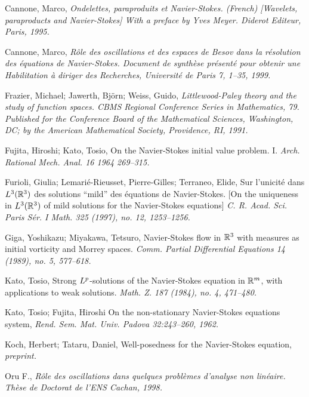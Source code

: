 \documentclass[12pt]{amsart}
\newcommand{\R}{{\mathbb R}}
\begin{document}
\begin{thebibliography}{999}

Cannone, Marco, {\em Ondelettes, paraproduits et Navier-Stokes. (French) 
[Wavelets, paraproducts and Navier-Stokes] With a preface by Yves
Meyer. Diderot Editeur, Paris, 1995.}

Cannone, Marco, {\em R\^ole des oscillations et des espaces de Besov 
dans la r\'esolution des \'equations de Navier-Stokes. 
Document de synth\`ese pr\'esent\'e pour obtenir une Habilitation \`a 
diriger des Recherches, Universit\'e de Paris 7, 1--35, 1999.}

Frazier, Michael; Jawerth, Bj\"orn; Weiss, Guido, 
{\em Littlewood-Paley theory and the study of function spaces. 
CBMS Regional Conference
Series in Mathematics, 79. 
Published for the Conference Board of the Mathematical Sciences, 
Washington, DC; by the American Mathematical Society,
Providence, RI, 1991.}

Fujita, Hiroshi; Kato, Tosio, 
On the Navier-Stokes initial value problem. I. 
{\em Arch. Rational Mech. Anal. 16 1964 269--315.}

Furioli, Giulia; Lemari\'e-Rieusset, Pierre-Gilles; Terraneo, Elide, 
Sur l'unicit\'e dans $L\sp 3({\R}\sp 3)$ des solutions ``mild'' des 
\'equations de Navier-Stokes.
[On the uniqueness in
$L\sp 3({\R}\sp 3)$ of mild solutions for the Navier-Stokes equations] 
{\em C. R. Acad. Sci. Paris S\'er. I Math. 325 (1997), no. 12, 1253--1256.}

Giga, Yoshikazu; Miyakawa, Tetsuro, Navier-Stokes flow in 
$\R\sp 3$ with measures as initial vorticity and Morrey spaces. 
{\em Comm.
Partial Differential Equations 14 (1989), no. 5, 577--618.}

Kato, Tosio, Strong $L\sp{p}$-solutions of the Navier-Stokes equation in 
${\R}\sp{m}$, with applications to weak solutions. 
{\em Math.
Z. 187 (1984), no. 4, 471--480.}

Kato, Tosio; Fujita, Hiroshi  
On the non-stationary 
Navier-Stokes equations system, 
{\em Rend. Sem. Mat. Univ. 
Padova 32:243--260, 1962.}

Koch, Herbert; Tataru, Daniel,
Well-posedness for the Navier-Stokes equation, 
{\em preprint.}

 Oru F.,
{\em R\^ole des oscillations dans quelques probl\`emes d'analyse non 
lin\'eaire. Th\`ese de Doctorat de l'ENS Cachan, 1998.}

\end{thebibliography}
\end{document}
